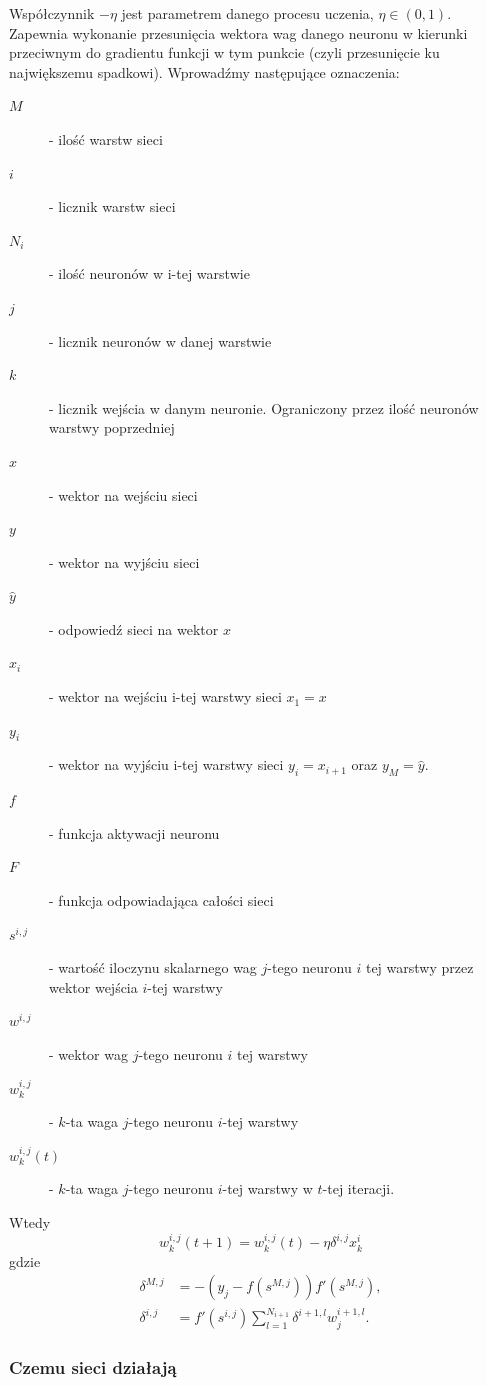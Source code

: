 \documentclass[10pt,a4paper]{book}
\begin{document}
Współczynnik $-\eta$ jest parametrem danego procesu uczenia, $\eta \in (0,1)$. Zapewnia wykonanie przesunięcia wektora wag danego neuronu w kierunki przeciwnym do gradientu funkcji w tym punkcie (czyli przesunięcie ku największemu spadkowi).  Wprowadźmy następujące oznaczenia:
\begin{description}
\item[$M$] - ilość warstw sieci
\item[$i$] - licznik warstw sieci
\item[$N_i$] - ilość neuronów w i-tej warstwie
\item[$j$] - licznik neuronów w danej warstwie
\item[$k$] - licznik wejścia w danym neuronie. Ograniczony przez ilość neuronów warstwy poprzedniej
\item[$x$] - wektor na wejściu sieci
\item[$y$] - wektor na wyjściu sieci
\item[$\hat{y}$] - odpowiedź sieci na wektor $x$
\item[$x_i$] - wektor na wejściu i-tej warstwy sieci $x_1 = x$
\item[$y_i$] - wektor na wyjściu i-tej warstwy sieci $y_i = x_{i+1}$ oraz $y_M = \hat{y}$.
\item[$f$] - funkcja aktywacji neuronu
\item[$F$] - funkcja odpowiadająca całości sieci
\item[$s^{i,j}$] - wartość iloczynu skalarnego wag $j$-tego neuronu $i$ tej warstwy przez wektor wejścia $i$-tej warstwy
\item[$w^{i,j}$] - wektor wag $j$-tego neuronu $i$ tej warstwy
\item[$w^{i,j}_k$] - $k$-ta waga $j$-tego neuronu $i$-tej warstwy
\item[$w^{i,j}_k(t)$] - $k$-ta waga $j$-tego neuronu $i$-tej warstwy w $t$-tej iteracji.
\end{description}

Wtedy 
\begin{equation*}
w^{i,j}_k (t+1) = w^{i,j}_k(t) - \eta \delta^{i,j} x^{i}_k
\end{equation*}
gdzie
\begin{eqnarray*}
\delta^{M,j} &= -( y_j - f(s^{M,j} ))  f'(s^{M,j}), \\
\delta^{i,j} &= f'(s^{i,j}) \sum_{l=1}^{N_{i+1}} \delta^{i+1,l} w^{i+1,l}_j.
\end{eqnarray*}

\subsubsection{Czemu sieci działają}
\end{document}
